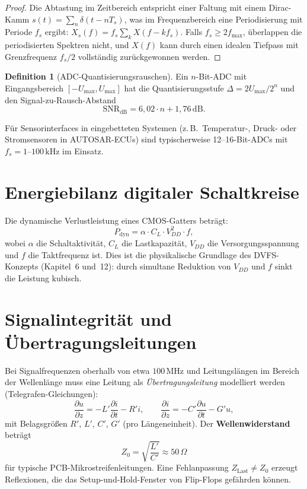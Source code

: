 ﻿\documentclass[a4paper,12pt]{scrreprt}
\theoremstyle{definition}
\newtheorem{definition}{Definition}[chapter]
\begin{document}
	\begin{proof}
		Die Abtastung im Zeitbereich entspricht einer Faltung mit einem Dirac-Kamm
		$s(t) = \sum_n \delta(t - nT_s)$, was im Frequenzbereich eine Periodisierung
		mit Periode $f_s$ ergibt: $X_s(f) = f_s \sum_k X(f - kf_s)$. Falls
		$f_s \geq 2f_{\max}$, überlappen die periodisierten Spektren nicht, und
		$X(f)$ kann durch einen idealen Tiefpass mit Grenzfrequenz $f_s/2$
		vollständig zurückgewonnen werden.
	\end{proof}
	
	\begin{definition}[ADC-Quantisierungsrauschen]
		Ein $n$-Bit-ADC mit Eingangsbereich $[-U_{\max}, U_{\max}]$ hat die
		Quantisierungsstufe $\Delta = 2U_{\max}/2^n$ und den Signal-zu-Rausch-Abstand
		\[
		\mathrm{SNR}_{\mathrm{dB}} = 6{,}02 \cdot n + 1{,}76\,\mathrm{dB}.
		\]
	\end{definition}
	
	Für Sensorinterfaces in eingebetteten Systemen (z.\,B.\ Temperatur-, Druck-
	oder Stromsensoren in AUTOSAR-ECUs) sind typischerweise 12--16-Bit-ADCs
	mit $f_s = 1$--$100\,\mathrm{kHz}$ im Einsatz.
	
	\section{Energiebilanz digitaler Schaltkreise}
	
	Die dynamische Verlustleistung eines CMOS-Gatters beträgt:
	\[
	P_{\text{dyn}} = \alpha \cdot C_L \cdot V_{DD}^2 \cdot f,
	\]
	wobei $\alpha$ die Schaltaktivität, $C_L$ die Lastkapazität, $V_{DD}$
	die Versorgungsspannung und $f$ die Taktfrequenz ist. Dies ist die
	physikalische Grundlage des DVFS-Konzepts (Kapitel~6 und~12): durch
	simultane Reduktion von $V_{DD}$ und $f$ sinkt die Leistung kubisch.

	\section{Signalintegrität und Übertragungsleitungen}

	Bei Signalfrequenzen oberhalb von etwa $100\,\text{MHz}$ und Leitungslängen
	im Bereich der Wellenlänge muss eine Leitung als \emph{Übertragungsleitung}
	modelliert werden (Telegrafen-Gleichungen):
	\[
	\frac{\partial u}{\partial z} = -L'\frac{\partial i}{\partial t} - R' i,
	\qquad
	\frac{\partial i}{\partial z} = -C'\frac{\partial u}{\partial t} - G' u,
	\]
	mit Belagsgrößen $R'$, $L'$, $C'$, $G'$ (pro Längeneinheit).
	Der \textbf{Wellenwiderstand} beträgt
	\[
	Z_0 = \sqrt{\frac{L'}{C'}} \approx 50\,\Omega
	\]
	für typische PCB-Mikro\-streifenleitungen. Eine Fehlanpassung
	$Z_{\mathrm{Last}} \neq Z_0$ erzeugt Reflexionen, die das Setup-und-Hold-Fenster
	von Flip-Flops gefährden können.
\end{document}
